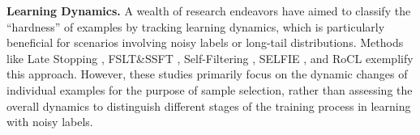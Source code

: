 \textbf{Learning Dynamics.}
A wealth of research endeavors have aimed to classify the ``hardness'' of examples by tracking learning dynamics, which is particularly beneficial for scenarios involving noisy labels or long-tail distributions. Methods like Late Stopping \citep{yuan2023latestopping}, FSLT\&SSFT \citep{maini2022characterizing}, Self-Filtering \citep{wei2022self}, SELFIE \citep{song2019selfie}, and RoCL \citep{zhou2021robust} exemplify this approach. 
However, these studies primarily focus on the dynamic changes of individual examples for the purpose of sample selection, rather than assessing the overall dynamics to distinguish different stages of the training process in learning with noisy labels.

\clearpage